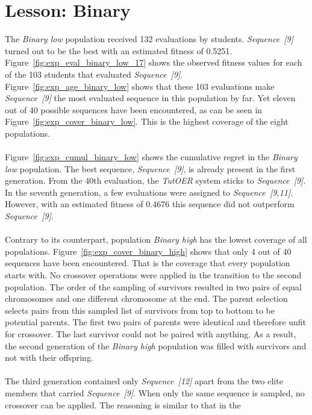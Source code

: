 \section{Lesson: Binary}
\label{sec:results_binary}
The \emph{Binary low} population received 132 evaluations by students.
\emph{Sequence~[9]} turned out to be the best with an estimated fitness of
0.5251. Figure~\ref{fig:exp_eval_binary_low_17} shows the observed fitness
values for each of the 103 students that evaluated \emph{Sequence~[9]}.
Figure~\ref{fig:exp_age_binary_low} shows that these 103 evaluations make
\emph{Sequence~[9]} the most evaluated sequence in this population by far. Yet
eleven out of 40 possible sequences have been encountered, as can be seen in
Figure~\ref{fig:exp_cover_binary_low}. This is the highest coverage of the
eight populations.\\\\
\noindent
Figure~\ref{fig:exp_cumul_binary_low} shows the cumulative regret in the
\emph{Binary low} population. The best sequence, \emph{Sequence~[9]}, is
already present in the first generation. From the 40th evaluation, the \emph{TutOER}
system sticks to \emph{Sequence~[9]}. In the seventh generation, a few
evaluations were assigned to \emph{Sequence~[9,11]}. However, with an estimated
fitness of 0.4676 this sequence did not outperform \emph{Sequence~[9]}.\\\\
\noindent
Contrary to its counterpart, population \emph{Binary high} has the lowest
coverage of all populations. Figure~\ref{fig:exp_cover_binary_high} shows that
only 4 out of 40 sequences have been encountered. That is the coverage
that every population starts with. No crossover operations were applied in the
transition to the second population. The order of the sampling of survivors
resulted in two pairs of equal chromosomes and one different chromosome at the
end. The parent selection selects pairs from this sampled list of survivors
from top to bottom to be potential parents. The first two pairs of
parents were identical and therefore unfit for crossover. The last survivor
could not be paired with anything. As a result, the second generation of the
\emph{Binary high} population was filled with survivors and not with their
offspring.\\\\
\noindent
The third generation contained only \emph{Sequence~[12]} apart from the two
elite members that carried \emph{Sequence~[9]}. When only the same sequence is
sampled, no crossover can be applied. The reasoning is similar to that in the
